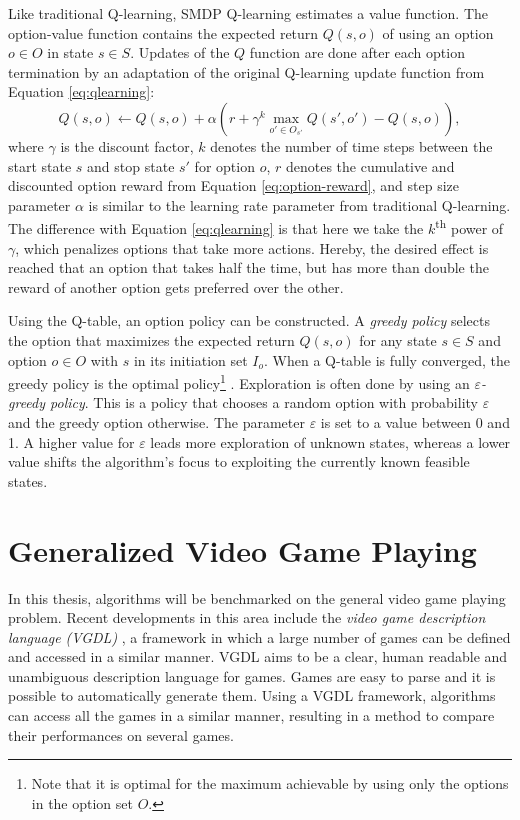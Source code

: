 Like traditional Q-learning, SMDP Q-learning estimates a value function. The
option-value function contains the expected return $Q(s, o)$ of using an option
$o \in O$ in state $s \in S$. Updates of the $Q$ function are done after each
option termination by an adaptation of the original Q-learning update function
from Equation \ref{eq:qlearning}:
\begin{equation}
	\label{eq:smdp-qlearning}
	Q(s, o) \gets Q(s, o) + \alpha \left(r + \gamma^k \max_{o' \in O_{s'}}Q(s',
	o') - Q(s, o)\right),
\end{equation}
where $\gamma$ is the discount factor, $k$ denotes the number of time steps
between the start state $s$ and stop state $s'$ for option $o$, $r$ denotes
the cumulative and discounted option reward from Equation
\ref{eq:option-reward}, and step size parameter $\alpha$ is similar to the
learning rate parameter from traditional Q-learning.  The difference with
Equation \ref{eq:qlearning} is that here we take the $k$\textsuperscript{th}
power of $\gamma$, which penalizes options that take more actions. Hereby, the
desired effect is reached that an option that takes half the time, but has more
than double the reward of another option gets preferred over the other.

Using the Q-table, an option policy can be constructed. A \emph{greedy policy}
selects the option that maximizes the expected return $Q(s, o)$ for any state
$s \in S$ and option $o \in O$ with $s$ in its initiation set $I_o$. When a Q-table
is fully converged, the greedy policy is the optimal policy\footnote{Note that
it is optimal for the maximum achievable by using only the options in the option
set $O$.} \cite{sutton1999between}. Exploration is often done by using an
\emph{$\varepsilon$-greedy policy}. This is a policy that chooses a random option
with probability $\varepsilon$ and the greedy option otherwise. The parameter
$\varepsilon$ is set to a value between 0 and 1. A higher value for $\varepsilon$
leads more exploration of unknown states, whereas a lower value shifts the
algorithm's focus to exploiting the currently known feasible states.

\section{Generalized Video Game Playing}
\label{subsec:vgdl}

In this thesis, algorithms will be benchmarked on the general video game playing
problem. Recent developments in this area include the \emph{video game
description language (VGDL)} \cite{schaul2013video}, a framework in which a
large number of games can be defined and accessed in a similar manner.
VGDL aims to be a clear, human readable and unambiguous description language for
games. Games are easy to parse and it is possible to automatically generate
them. Using a VGDL framework, algorithms can access all the games in a similar
manner, resulting in a method to compare their performances on several games.

